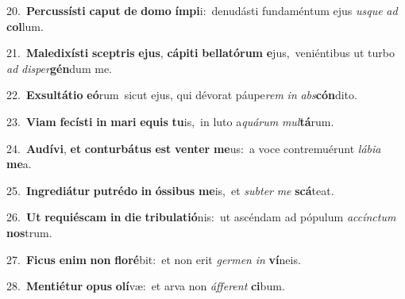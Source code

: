 {{\numbfont\textcolor{\numbcolor}{20.}}~\-\textbf{Per}\-\textbf{cus}\textbf{sís}\textbf{ti} \textbf{ca}\-\textbf{put} \textbf{de} \textbf{do}\-\textbf{mo} \textbf{ím}\-\textbf{pi}i:~\star denudásti fundaméntum ejus \textit{us}\-\textit{que} \textit{ad} \textbf{col}\-lum.\par
{\numbfont\textcolor{\numbcolor}{21.}}~\-\textbf{Ma}\-\textbf{le}\textbf{di}\textbf{xís}\textbf{ti} \textbf{scep}\-\textbf{tris} \textbf{e}\-\textbf{jus}, \textbf{cá}\-\textbf{pi}\textbf{ti} \textbf{bel}\-\textbf{la}\textbf{tó}\textbf{rum} \textbf{e}\-jus,~\star veniéntibus ut turbo \textit{ad} \textit{di}\-\textit{sper}\textbf{gén}dum me.\par
{\numbfont\textcolor{\numbcolor}{22.}}~\-\textbf{Ex}\-\textbf{sul}\textbf{tá}\textbf{ti}\textbf{o} \textbf{e}\-\textbf{ó}rum~\star sicut ejus, qui dévorat páupe\textit{rem} \textit{in} \textit{abs}\-\textbf{cón}dito.\par
{\numbfont\textcolor{\numbcolor}{23.}}~\-\textbf{Vi}\-\textbf{am} \textbf{fe}\-\textbf{cís}\textbf{ti} \textbf{in} \textbf{ma}\-\textbf{ri} \textbf{e}\-\textbf{quis} \textbf{tu}\-is,~\star in luto a\-\textit{quá}\-\textit{rum} \textit{mul}\-\textbf{tá}rum.\par
{\numbfont\textcolor{\numbcolor}{24.}}~\-\textbf{Au}\-\textbf{dí}\textbf{vi}, \textbf{et} \textbf{con}\-\textbf{tur}\textbf{bá}\textbf{tus} \textbf{est} \textbf{ven}\-\textbf{ter} \textbf{me}\-us:~\star a voce contremuérunt \textit{lá}\-\textit{bi}\textit{a} \textbf{me}\-a.\par
{\numbfont\textcolor{\numbcolor}{25.}}~\-\textbf{In}\-\textbf{gre}\textbf{di}\textbf{á}\textbf{tur} \textbf{pu}\-\textbf{tré}\textbf{do} \textbf{in} \textbf{ós}\-\textbf{si}\textbf{bus} \textbf{me}\-is,~\star et \textit{sub}\-\textit{ter} \textit{me} \textbf{scá}\-teat.\par
{\numbfont\textcolor{\numbcolor}{26.}}~\textbf{Ut} \textbf{re}\-\textbf{qui}\textbf{és}\textbf{cam} \textbf{in} \textbf{di}\-\textbf{e} \textbf{tri}\-\textbf{bu}\textbf{la}\textbf{ti}\textbf{ó}nis:~\star ut ascéndam ad pópulum \textit{ac}\-\textit{cínc}\textit{tum} \textbf{nos}\-trum.\par
{\numbfont\textcolor{\numbcolor}{27.}}~\-\textbf{Fi}\-\textbf{cus} \textbf{e}\-\textbf{nim} \textbf{non} \textbf{flo}\-\textbf{ré}bit:~\star et non erit \textit{ger}\-\textit{men} \textit{in} \textbf{ví}\-neis.\par
{\numbfont\textcolor{\numbcolor}{28.}}~\-\textbf{Men}\-\textbf{ti}\textbf{é}\textbf{tur} \textbf{o}\-\textbf{pus} \textbf{o}\-\textbf{lí}væ:~\star et arva non \textit{áf}\-\textit{fe}\textit{rent} \textbf{ci}\-bum.\par
}
